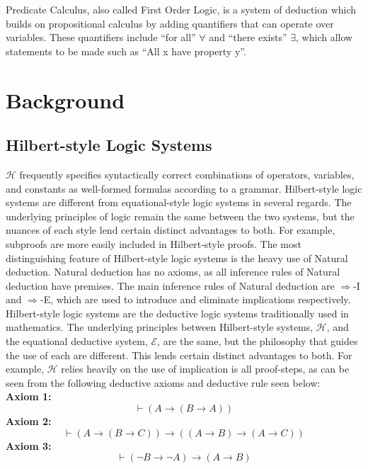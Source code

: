 \documentclass[fleqn, leqno]{article}
\begin{document}
Predicate Calculus, also called First Order Logic, is a system of deduction which builds on propositional calculus by adding quantifiers that can operate over variables.  These quantifiers include ``for all'' $\forall$ and ``there exists'' $\exists$, which allow statements to be made such as ``All x have property y''.\\

\section{Background}

\subsection{Hilbert-style Logic Systems}

$\mathcal{H}$ frequently specifies syntactically correct combinations of operators, variables, and constants as well-formed formulas
according to a grammar.
Hilbert-style logic systems are different from equational-style logic systems in several regards.  The underlying principles of logic remain the same between the two systems, but the nuances of each style lend certain distinct advantages to both.  For example, subproofs are more easily included in Hilbert-style proofs.  The most distinguishing feature of Hilbert-style logic systems is the heavy use of Natural deduction.  Natural deduction has no axioms, as all inference rules of Natural deduction have premises.  The main inference rules of Natural deduction are $\Rightarrow$-I and $\Rightarrow$-E, which are used to introduce and eliminate implications respectively.\\

Hilbert-style logic systems are the deductive logic systems traditionally used in mathematics.  The underlying principles between Hilbert-style systems, $\mathcal{H}$, and the equational deductive system, $\mathcal{E}$, are the same, but the philosophy that guides the use of each are different.  This lends certain distinct advantages to both.  For example, $\mathcal{H}$ relies heavily on the use of implication is all proof-steps, as can be seen from the following deductive axioms and deductive rule seen below:\\

\textbf{Axiom 1:}
\[
\vdash (A \rightarrow (B \rightarrow A))
\]
\textbf{Axiom 2:}
\[
\vdash (A \rightarrow (B \rightarrow C)) \rightarrow ((A \rightarrow B) \rightarrow (A \rightarrow C))
\]
\textbf{Axiom 3:}
\[
\vdash (\lnot B \rightarrow \lnot A) \rightarrow (A \rightarrow B)
\]
\end{document}

